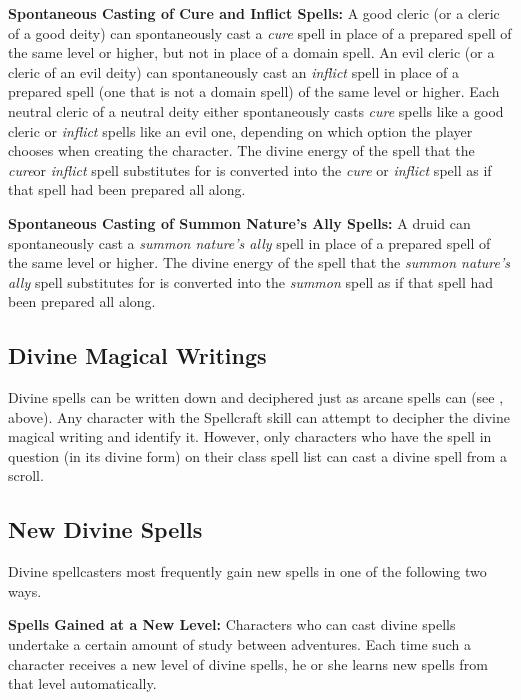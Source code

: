 \textbf{Spontaneous Casting of Cure and Inflict Spells:}
A good cleric (or a cleric of a good deity) can spontaneously 
cast a \textit{cure} spell in place of a prepared spell of the same level or higher, 
but not in place of a domain spell. An evil cleric (or a cleric of an evil deity) 
can spontaneously cast an \textit{inflict} spell in place of a prepared spell (one 
that is not a domain spell) of the same level or higher. Each neutral cleric of 
a neutral deity either spontaneously casts \textit{cure} spells like a good cleric 
or \textit{inflict} spells like an evil one, depending on which option the player 
chooses when creating the character. The divine energy of the spell that the
\textit{cure}or \textit{inflict} spell substitutes for is converted into the \textit{cure} or 
\textit{inflict} spell as if that spell had been prepared all along.

\textbf{Spontaneous Casting of Summon Nature's Ally Spells:} 
A druid can spontaneously cast a \textit{summon nature's ally} spell in place of 
a prepared spell of the same level or higher. The divine energy of the spell that 
the \textit{summon nature's ally} spell substitutes for is converted into the \textit{summon}
spell as if that spell had been prepared all along.

\subsection{Divine Magical Writings}

Divine spells can be written down and deciphered just as arcane spells can (see 
, above). Any character with the Spellcraft skill can attempt 
to decipher the divine magical writing and identify it. However, only characters 
who have the spell in question (in its divine form) on their class spell list can 
cast a divine spell from a scroll.

\subsection{New Divine Spells}

Divine spellcasters most frequently gain new spells in one of the following two 
ways.

\textbf{Spells Gained at a New Level:} Characters who can cast divine spells undertake 
a certain amount of study between adventures. Each time such a character receives 
a new level of divine spells, he or she learns new spells from that level automatically.

